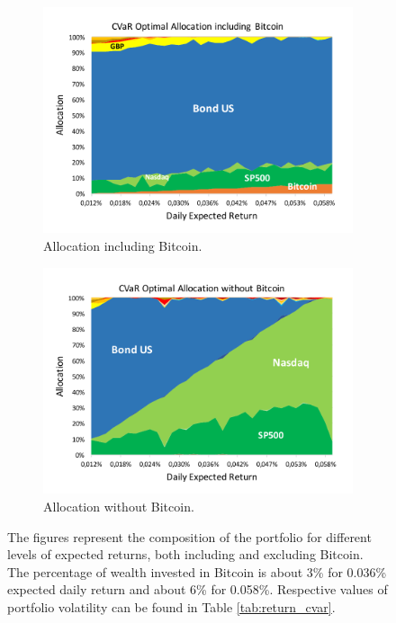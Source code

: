 \begin{figure}
	\centering
	\begin{subfigure}{0.8\textwidth}
		\includegraphics[width=\linewidth]{Images/cvar_allocation}
		\caption{Allocation including Bitcoin.}
	\end{subfigure}
	
	\begin{subfigure}{0.8\textwidth}
		\centering
		\includegraphics[width=\linewidth]{Images/cvar_allocation_no_btc}
		\caption{Allocation without Bitcoin.}
	\end{subfigure}
	\caption[CVaR Optimal Allocations]{The figures represent the composition of the portfolio for different levels of expected returns, both including and excluding Bitcoin.  The percentage of wealth invested in Bitcoin is about 3\%  for  0.036\% expected daily return and  about 6\% for 0.058\%. Respective values of portfolio volatility can be found in Table \ref{tab:return_cvar}.}
	\label{fig:cvar_allocation}
\end{figure}
